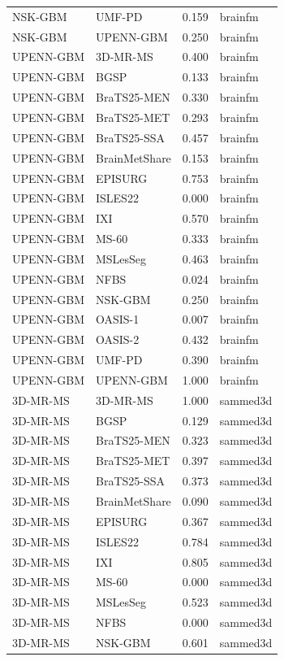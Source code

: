 \begin{tabular}{llrl}
NSK-GBM & UMF-PD & 0.159 & brainfm \\
NSK-GBM & UPENN-GBM & 0.250 & brainfm \\
UPENN-GBM & 3D-MR-MS & 0.400 & brainfm \\
UPENN-GBM & BGSP & 0.133 & brainfm \\
UPENN-GBM & BraTS25-MEN & 0.330 & brainfm \\
UPENN-GBM & BraTS25-MET & 0.293 & brainfm \\
UPENN-GBM & BraTS25-SSA & 0.457 & brainfm \\
UPENN-GBM & BrainMetShare & 0.153 & brainfm \\
UPENN-GBM & EPISURG & 0.753 & brainfm \\
UPENN-GBM & ISLES22 & 0.000 & brainfm \\
UPENN-GBM & IXI & 0.570 & brainfm \\
UPENN-GBM & MS-60 & 0.333 & brainfm \\
UPENN-GBM & MSLesSeg & 0.463 & brainfm \\
UPENN-GBM & NFBS & 0.024 & brainfm \\
UPENN-GBM & NSK-GBM & 0.250 & brainfm \\
UPENN-GBM & OASIS-1 & 0.007 & brainfm \\
UPENN-GBM & OASIS-2 & 0.432 & brainfm \\
UPENN-GBM & UMF-PD & 0.390 & brainfm \\
UPENN-GBM & UPENN-GBM & 1.000 & brainfm \\
3D-MR-MS & 3D-MR-MS & 1.000 & sammed3d \\
3D-MR-MS & BGSP & 0.129 & sammed3d \\
3D-MR-MS & BraTS25-MEN & 0.323 & sammed3d \\
3D-MR-MS & BraTS25-MET & 0.397 & sammed3d \\
3D-MR-MS & BraTS25-SSA & 0.373 & sammed3d \\
3D-MR-MS & BrainMetShare & 0.090 & sammed3d \\
3D-MR-MS & EPISURG & 0.367 & sammed3d \\
3D-MR-MS & ISLES22 & 0.784 & sammed3d \\
3D-MR-MS & IXI & 0.805 & sammed3d \\
3D-MR-MS & MS-60 & 0.000 & sammed3d \\
3D-MR-MS & MSLesSeg & 0.523 & sammed3d \\
3D-MR-MS & NFBS & 0.000 & sammed3d \\
3D-MR-MS & NSK-GBM & 0.601 & sammed3d \\

\end{tabular}
